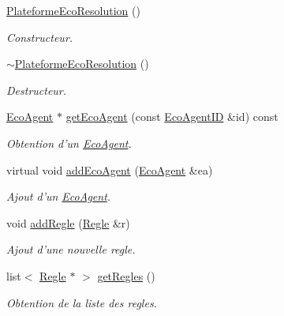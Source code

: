 \begin{CompactItemize}
\item 
\hyperlink{classPlateformeEcoResolution_6e03cc2c6a51bc4a47d2d226e41d13e9}{PlateformeEcoResolution} ()
\begin{CompactList}\small\item\em Constructeur. \item\end{CompactList}\item 
\hyperlink{classPlateformeEcoResolution_356b4862f53c4be870304e5186601b5a}{$\sim$PlateformeEcoResolution} ()
\begin{CompactList}\small\item\em Destructeur. \item\end{CompactList}\item 
\hyperlink{classEcoAgent}{EcoAgent} $\ast$ \hyperlink{classPlateformeEcoResolution_acd4e2899f178261ddd0fde086932e84}{getEcoAgent} (const \hyperlink{classEcoAgentID}{EcoAgentID} \&id) const 
\begin{CompactList}\small\item\em Obtention d'un \hyperlink{classEcoAgent}{EcoAgent}. \item\end{CompactList}\item 
virtual void \hyperlink{classPlateformeEcoResolution_6fdb4c8ecc62252da4326d9763d4f28d}{addEcoAgent} (\hyperlink{classEcoAgent}{EcoAgent} \&ea)
\begin{CompactList}\small\item\em Ajout d'un \hyperlink{classEcoAgent}{EcoAgent}. \item\end{CompactList}\item 
void \hyperlink{classPlateformeEcoResolution_c2978a0e31b186415ca156a19ac8a1dc}{addRegle} (\hyperlink{classRegle}{Regle} \&r)
\begin{CompactList}\small\item\em Ajout d'une nouvelle regle. \item\end{CompactList}\item 
list$<$ \hyperlink{classRegle}{Regle} $\ast$ $>$ \hyperlink{classPlateformeEcoResolution_81dad57670e80ac2d29d02918b610636}{getRegles} ()
\begin{CompactList}\small\item\em Obtention de la liste des regles. \item\end{CompactList}\item 

\end{CompactItemize}
